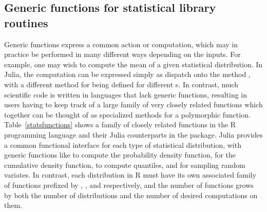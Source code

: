 \documentclass[pldi]{sigplanconf-pldi15}
\begin{document}
\subsection{Generic functions for statistical library routines}

Generic functions express a common action or computation, which may in
practice be performed in many different ways depending on the inputs. For
example, one may wish to compute the mean of a given statistical distribution.
In Julia, the computation can be expressed simply as dispatch onto the method
, with a different method for  being
defined for different s. In contrast, much scientific code
is written in languages that lack generic functions, resulting in users having
to keep track of a large family of very closely related functions which
together can be thought of as specialized methods for a polymorphic function.
Table~\ref{statsfunctions} shows a family of closely related functions in the R
programming language and their Julia counterparts in the
 package. Julia provides a common functional interface
for each type of statistical distribution, with generic functions like
 to compute the probability density function,  for the
cumulative density function,  to compute quantiles, and
 for sampling random variates. In contrast, each distribution in R
must have its own associated family of functions prefixed by ,
,  and  respectively, and the number of functions grows
by both the number of distributions and the number of desired computations on
them.
\end{document}
